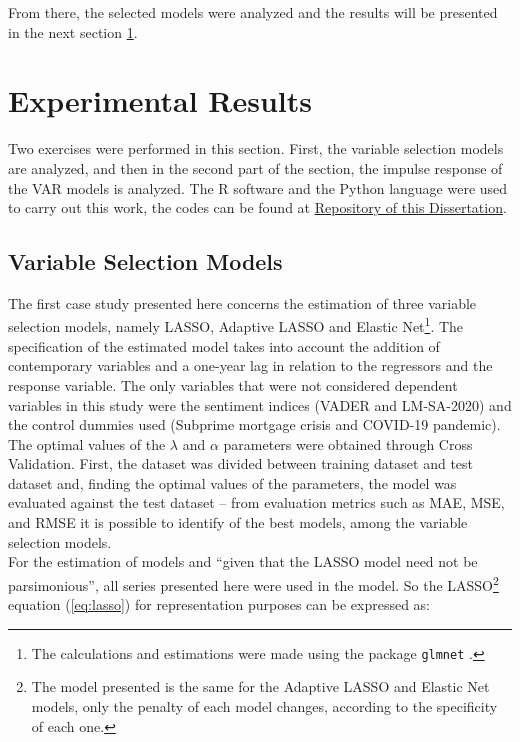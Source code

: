 From there, the selected models were analyzed and the results will be presented in the next  section  \ref{sec:expresults}.

\section{Experimental Results} \label{sec:expresults}

Two exercises were performed in this section. First, the variable selection models are analyzed, and then in the second part of the section, the impulse response of the VAR models is analyzed. The R software and the Python language \cite[]{van1995python} were used to carry out this work, the codes can be found at \href{https://github.com/gustavovital/Dissertation}{Repository of this Dissertation}.\\

\subsection{Variable Selection Models}

The first case study presented here concerns the estimation of three variable selection models, namely LASSO, Adaptive LASSO and Elastic Net\footnote{The calculations and estimations were made using the package \texttt{glmnet} \cite[] {glmnet2011noah}.}. The specification of the estimated model takes into account the addition of contemporary variables and a one-year lag in relation to the regressors and the response variable. The only variables that were not considered dependent variables in this study were the sentiment indices (VADER and LM-SA-2020) and the control dummies used (Subprime mortgage crisis and COVID-19 pandemic).\\

The optimal values of the $\lambda$ and $\alpha$ parameters were obtained through Cross Validation. First, the dataset was divided between training dataset and test dataset and, finding the optimal values of the parameters, the model was evaluated against the test dataset -- from evaluation metrics such as MAE, MSE, and RMSE it is possible to identify of the best models, among the variable selection models.\\

For the estimation of models and ``given that the LASSO model need not be parsimonious''\cite[p. 25]{shapiro2020measuring}, all series presented here were used in the model. So the LASSO\footnote{The model presented is the same for the Adaptive LASSO and Elastic Net models, only the penalty of each model changes, according to the specificity of each one.} equation (\ref{eq:lasso}) for representation purposes can be expressed as:

